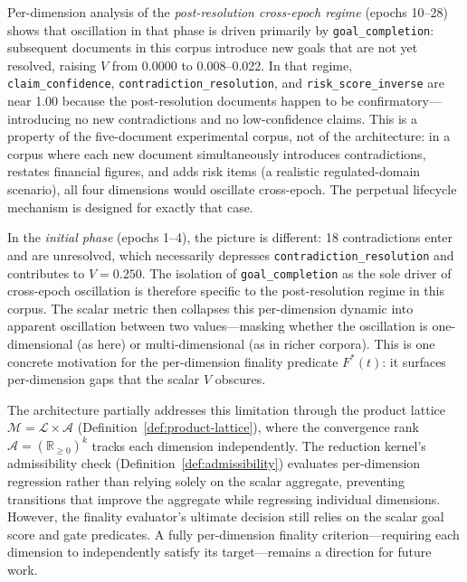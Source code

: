 \documentclass[11pt]{article}
\begin{document}
Per-dimension analysis of the \emph{post-resolution cross-epoch regime} (epochs 10--28) shows that oscillation in that phase is driven primarily by \texttt{goal\_completion}: subsequent documents in this corpus introduce new goals that are not yet resolved, raising $V$ from 0.0000 to 0.008--0.022. In that regime, \texttt{claim\_confidence}, \texttt{contradiction\_resolution}, and \texttt{risk\_score\_inverse} are near 1.00 because the post-resolution documents happen to be confirmatory---introducing no new contradictions and no low-confidence claims. This is a property of the five-document experimental corpus, not of the architecture: in a corpus where each new document simultaneously introduces contradictions, restates financial figures, and adds risk items (a realistic regulated-domain scenario), all four dimensions would oscillate cross-epoch. The perpetual lifecycle mechanism is designed for exactly that case.

In the \emph{initial phase} (epochs 1--4), the picture is different: 18 contradictions enter and are unresolved, which necessarily depresses \texttt{contradiction\_resolution} and contributes to $V = 0.250$. The isolation of \texttt{goal\_completion} as the sole driver of cross-epoch oscillation is therefore specific to the post-resolution regime in this corpus. The scalar metric then collapses this per-dimension dynamic into apparent oscillation between two values---masking whether the oscillation is one-dimensional (as here) or multi-dimensional (as in richer corpora). This is one concrete motivation for the per-dimension finality predicate $F^*(t)$: it surfaces per-dimension gaps that the scalar $V$ obscures.

The architecture partially addresses this limitation through the product lattice $\mathcal{M} = \mathcal{L} \times \mathcal{A}$ (Definition~\ref{def:product-lattice}), where the convergence rank $\mathcal{A} = (\mathbb{R}_{\geq 0})^k$ tracks each dimension independently. The reduction kernel's admissibility check (Definition~\ref{def:admissibility}) evaluates per-dimension regression rather than relying solely on the scalar aggregate, preventing transitions that improve the aggregate while regressing individual dimensions. However, the finality evaluator's ultimate decision still relies on the scalar goal score and gate predicates. A fully per-dimension finality criterion---requiring each dimension to independently satisfy its target---remains a direction for future work.
\end{document}
